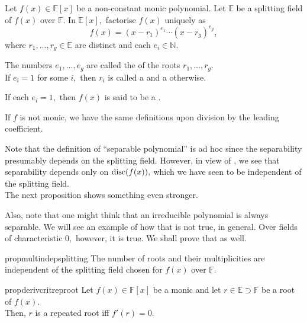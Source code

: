 \begin{defn}%
    Let $f(x) \in \mathbb{F}[x]$ be a non-constant monic polynomial. Let $\mathbb{E}$ be a splitting field of $f(x)$ over $\mathbb{F}.$ In $\mathbb{E}[x],$ factorise $f(x)$ uniquely as
    \begin{equation*} 
        f(x) = (x - r_1)^{e_1} \cdots (x - r_g)^{e_g},
    \end{equation*}
    where $r_1, \ldots, r_g \in \mathbb{E}$ are distinct and each $e_i \in \mathbb{N}.$ 

    The numbers $e_1, \ldots, e_g$ are called the  of the roots $r_1, \ldots, r_g.$ \\
    If $e_i = 1$ for some $i,$ then $r_i$ is called a  and a  otherwise.

    If each $e_i = 1,$ then $f(x)$ is said to be a .

    If $f$ is not monic, we have the same definitions upon division by the leading coefficient.
\end{defn}

\begin{rem}
    Note that the definition of ``separable polynomial'' is ad hoc since the separability presumably depends on the splitting field. However, in view of , we see that separability depends only on $\operatorname{disc}(f(x)),$ which we have seen to be independent of the splitting field.\\
    The next proposition shows something even stronger.

    Also, note that one might think that an irreducible polynomial is always separable. We will see an example of how that is not true, in general. Over fields of characteristic $0,$ however, it is true. We shall prove that as well.
\end{rem}

\begin{restatable}[]{prop}{multindepsplitting}
\label{prop:multindepsplitting}
    The number of roots and their multiplicities are independent of the splitting field chosen for $f(x)$ over $\mathbb{F}.$ \hfill\hyperref[prop:multindepsplitting2]{\downsym}
\end{restatable}

\begin{restatable}[]{prop}{derivcritreproot}
\label{prop:derivcritreproot}
    Let $f(x) \in \mathbb{F}[x]$ be a monic and let $r \in \mathbb{E} \supset \mathbb{F}$ be a root of $f(x).$ \\
    Then, $r$ is a repeated root iff $f'(r) = 0.$ \hfill\hyperref[prop:derivcritreproot2]{\downsym}
\end{restatable}

